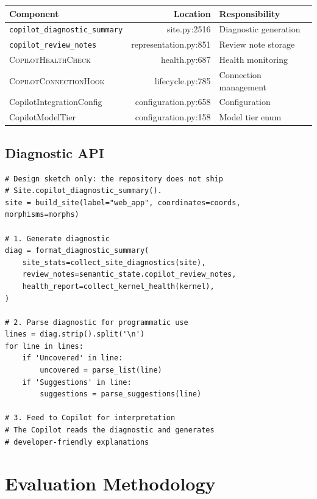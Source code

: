 \documentclass[11pt]{article}
\newcommand{\DiagSum}{\texttt{copilot\_diagnostic\_summary}}
\newcommand{\CopRevNotes}{\texttt{copilot\_review\_notes}}
\newcommand{\HealthChk}{\textsc{CopilotHealthCheck}}
\newcommand{\CopConn}{\textsc{CopilotConnectionHook}}
\begin{document}
\begin{center}
\begin{tabular}{lrl}
\toprule
\textbf{Component} & \textbf{Location} & \textbf{Responsibility} \\
\midrule
\DiagSum          & site.py:2516            & Diagnostic generation \\
\CopRevNotes      & representation.py:851   & Review note storage \\
\HealthChk        & health.py:687           & Health monitoring \\
\CopConn          & lifecycle.py:785        & Connection management \\
CopilotIntegrationConfig & configuration.py:658 & Configuration \\
CopilotModelTier  & configuration.py:158    & Model tier enum \\
\bottomrule
\end{tabular}
\end{center}

\subsection{Diagnostic API}

\begin{lstlisting}[style=jugeo-python]
# Design sketch only: the repository does not ship
# Site.copilot_diagnostic_summary().
site = build_site(label="web_app", coordinates=coords, morphisms=morphs)

# 1. Generate diagnostic
diag = format_diagnostic_summary(
    site_stats=collect_site_diagnostics(site),
    review_notes=semantic_state.copilot_review_notes,
    health_report=collect_kernel_health(kernel),
)

# 2. Parse diagnostic for programmatic use
lines = diag.strip().split('\n')
for line in lines:
    if 'Uncovered' in line:
        uncovered = parse_list(line)
    if 'Suggestions' in line:
        suggestions = parse_suggestions(line)

# 3. Feed to Copilot for interpretation
# The Copilot reads the diagnostic and generates
# developer-friendly explanations
\end{lstlisting}

\section{Evaluation Methodology}\label{sec:eval}
\end{document}
